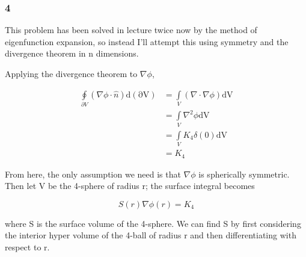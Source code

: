 \documentclass[12pt]{article}
\begin{document}
\subsubsection*{4}

This problem has been solved in lecture twice now by the method of eigenfunction expansion, so instead I'll attempt this using symmetry and the divergence theorem in n dimensions.

Applying the divergence theorem to \(\nabla\phi\),

\begin{align*}
\oint\limits_{\partial V} (\nabla\phi \cdot \hat{n}) \mathrm{d (\partial V)} &= \int\limits_{V} (\nabla \cdot \nabla\phi)\mathrm{dV}\\
&= \int\limits_{V} \nabla^2\phi\mathrm{dV}\\
&= \int\limits_{V} K_4 \delta(0)\mathrm{dV}\\
&= K_4
\end{align*}

From here, the only assumption we need is that \(\nabla\phi\) is spherically symmetric. Then let V be the 4-sphere of radius r; the surface integral becomes

\[S(r)\nabla\phi(r) = K_4
\]

where S is the surface volume of the 4-sphere. We can find S by first considering the interior hyper volume of the 4-ball of radius r and then differentiating with respect to r.
\end{document}

